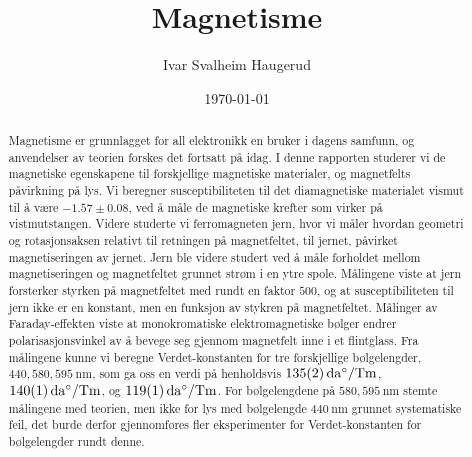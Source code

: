 \documentclass[%
 reprint,
 amsmath,amssymb,
 aps,
 norsk,
]{revtex4-1}
\begin{document}

\title{Magnetisme}%

\author{Ivar Svalheim Haugerud}

%

\date{\today}%

\begin{abstract}
Magnetisme er grunnlagget for all elektronikk en bruker i dagens samfunn, og anvendelser av teorien forskes det fortsatt på idag. I denne rapporten studerer vi de magnetiske egenskapene til forskjellige magnetiske materialer, og magnetfelts påvirkning på lys. Vi beregner susceptibiliteten til det diamagnetiske materialet vismut til å være $-1.57\pm0.08$, ved å måle de magnetiske krefter som virker på vistmutstangen.
Videre studerte vi ferromagneten jern, hvor vi måler hvordan geometri og rotasjonsaksen relativt til retningen på magnetfeltet, til jernet, påvirket magnetiseringen av jernet. Jern ble videre studert ved å måle forholdet mellom magnetiseringen og magnetfeltet grunnet strøm i en ytre spole. Målingene viste at jern forsterker styrken på magnetfeltet med rundt en faktor $500$, og at susceptibiliteten til jern ikke er en konstant, men en funksjon av stykren på magnetfeltet. Målinger av Faraday-effekten viste at monokromatiske elektromagnetiske bølger endrer polarisasjonsvinkel av å bevege seg gjennom magnetfelt inne i et flintglass. Fra målingene kunne vi beregne Verdet-konstanten for tre forskjellige bølgelengder, $440, 580, \SI{595}{\nano\meter}$, som ga oss en verdi på henholdsvis $\SI{135\pm2}{\deca\degree/\tesla\meter}$, $\SI{140\pm1}{\deca\degree/\tesla\meter}$, og $\SI{119\pm1}{\deca\degree/\tesla\meter}$.
For bølgelengdene på $580, \SI{595}{\nano\meter}$ stemte målingene med teorien, men ikke for lys med bølgelengde $\SI{440}{\nano\meter}$ grunnet systematiske feil, det burde derfor gjennomføres fler eksperimenter for Verdet-konstanten for bølgelengder rundt denne.
\end{abstract}

\maketitle
\end{document}
